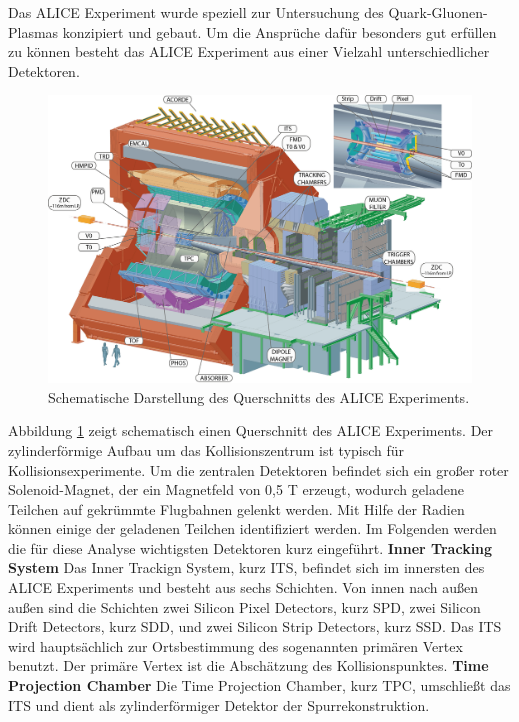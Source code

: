 Das ALICE Experiment wurde speziell zur Untersuchung des Quark-Gluonen-Plasmas konzipiert und gebaut.
Um die Anspr\"uche daf\"ur besonders gut erf\"ullen zu k\"onnen besteht das ALICE Experiment aus einer Vielzahl unterschiedlicher Detektoren.
\begin{figure}[thp]
\centering
\includegraphics[width=.9\linewidth]{ALICE.jpg}
\caption{Schematische Darstellung des Querschnitts des ALICE Experiments.
\cite{WEBSITE:1}}
\label{fig:ALICE}
\end{figure}
Abbildung \ref{fig:ALICE} zeigt schematisch einen Querschnitt des ALICE Experiments. Der zylinderf\"ormige Aufbau um das Kollisionszentrum ist typisch f\"ur Kollisionsexperimente.
\newline
Um die zentralen Detektoren befindet sich ein gro{\ss}er roter Solenoid-Magnet, der ein Magnetfeld von 0,5 T erzeugt, wodurch geladene Teilchen auf gekr\"ummte Flugbahnen gelenkt werden.
Mit Hilfe der Radien k\"onnen einige der geladenen Teilchen identifiziert werden.
Im Folgenden werden die f\"ur diese Analyse wichtigsten Detektoren kurz eingef\"uhrt.
\newline
\textbf{Inner Tracking System}
\newline
Das Inner Trackign System, kurz ITS, befindet sich im innersten des ALICE Experiments und besteht aus sechs Schichten.
Von innen nach au{\ss}en au{\ss}en sind die Schichten zwei Silicon Pixel Detectors, kurz SPD, zwei Silicon Drift Detectors, kurz SDD, und zwei Silicon Strip Detectors, kurz SSD.
Das ITS wird haupts\"achlich zur Ortsbestimmung des sogenannten prim\"aren Vertex benutzt.
Der prim\"are Vertex ist die Absch\"atzung des Kollisionspunktes.
\newline
\textbf{Time Projection Chamber}
\newline
Die Time Projection Chamber, kurz TPC, umschlie{\ss}t das ITS und dient als zylinderf\"ormiger Detektor der Spurrekonstruktion.
